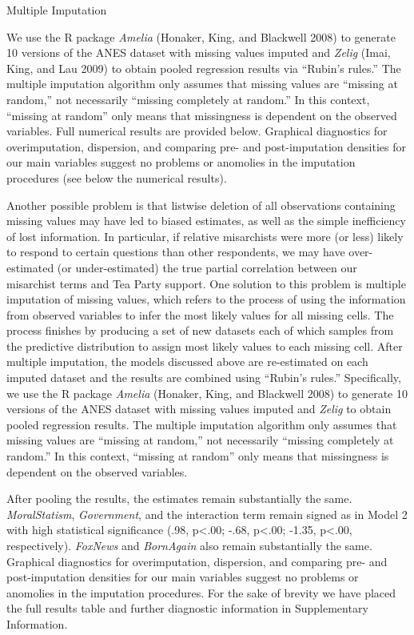 \documentclass[12pt,]{article}
\begin{document}
\clearpage

Multiple Imputation

We use the R package \emph{Amelia} (Honaker, King, and Blackwell 2008) to generate 10
versions of the ANES dataset with missing values imputed and
\emph{Zelig} (Imai, King, and Lau 2009) to obtain pooled regression results via ``Rubin's rules.'' The multiple
imputation algorithm only assumes that missing values are ``missing at
random,'' not necessarily ``missing completely at random.'' In this
context, ``missing at random'' only means that missingness is dependent
on the observed variables. Full numerical results are provided below. Graphical diagnostics for overimputation,
dispersion, and comparing pre- and post-imputation densities for our
main variables suggest no problems or anomolies in the imputation
procedures (see below the numerical results).

Another possible problem is that listwise deletion of all observations
containing missing values may have led to biased estimates, as well as
the simple inefficiency of lost information. In particular, if relative
misarchists were more (or less) likely to respond to certain questions
than other respondents, we may have over-estimated (or under-estimated)
the true partial correlation between our misarchist terms and Tea Party
support. One solution to this problem is multiple imputation of missing
values, which refers to the process of using the information from
observed variables to infer the most likely values for all missing
cells. The process finishes by producing a set of new datasets each of
which samples from the predictive distribution to assign most likely
values to each missing cell. After multiple imputation, the models
discussed above are re-estimated on each imputed dataset and the results
are combined using ``Rubin's rules.'' Specifically, we use the R package
\emph{Amelia} (Honaker, King, and Blackwell 2008) to generate 10
versions of the ANES dataset with missing values imputed and
\emph{Zelig} to obtain pooled regression results. The multiple
imputation algorithm only assumes that missing values are ``missing at
random,'' not necessarily ``missing completely at random.'' In this
context, ``missing at random'' only means that missingness is dependent
on the observed variables.

After pooling the results, the estimates remain substantially the same.
\emph{MoralStatism}, \emph{Government}, and the interaction term remain
signed as in Model 2 with high statistical significance (.98,
p\textless{}.00; -.68, p\textless{}.00; -1.35, p\textless{}.00,
respectively). \emph{FoxNews} and \emph{BornAgain} also remain
substantially the same. Graphical diagnostics for overimputation,
dispersion, and comparing pre- and post-imputation densities for our
main variables suggest no problems or anomolies in the imputation
procedures. For the sake of brevity we have placed the full results
table and further diagnostic information in Supplementary Information.
\end{document}

